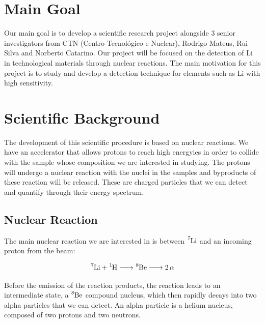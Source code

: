 \documentclass{article}
\begin{document}
\begin{multicols}{2}
\small
\section{Main Goal}
    \label{sec:maingoal}

Our main goal is to develop a scientific research project alongside 3 senior investigators from CTN (Centro Tecnológico e Nuclear), Rodrigo Mateus, Rui Silva and Norberto Catarino.
Our project will be focused on the detection of Li in technological materials through nuclear reactions. The main motivation for this project is to study and develop a detection technique for elements such as Li with high sensitivity.

\section{Scientific Background}
    \label{sec:scientificbackground}

The development of this scientific procedure is based on nuclear reactions. We have an accelerator that allows protons to reach high energyies in order to collide with the sample whose composition we are interested in studying. The protons will undergo a nuclear reaction with the nuclei in the samples and byproducts of these reaction will be released. These are charged particles that we can detect and quantify through their energy spectrum.

\subsection{Nuclear Reaction}
    \label{sec:nuclearreactions}

The main nuclear reaction we are interested in is between $\ce{^7Li}$ and an incoming proton from the beam:

\begin{equation}
  \ce{^7Li + ^1H -> ^8Be -> 2\alpha}
\label{eq:reactionLi}
\end{equation}

Before the emission of the reaction products, the reaction leads to an intermediate state, a $\ce{^8Be}$ compound nucleus, which then rapidly decays into two alpha particles that we can detect.
An alpha particle is a helium nucleus, composed of two protons and two neutrons. %



\end{multicols}
\end{document}

